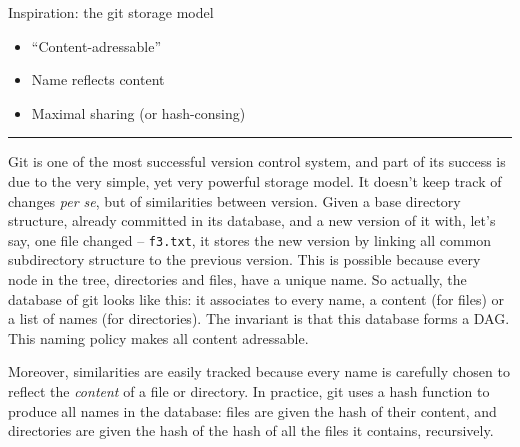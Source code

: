 \documentclass[ignorenonframetext,red]{beamer}
\begin{document}
\begin{frame}{Inspiration: the \textsf{git} storage model}
\begin{center}
\begin{overlayarea}{\textwidth}{12em}
    \end{overlayarea}
  \end{center}%
  \begin{itemize}\small %
  \item<7-> ``Content-adressable''%
  \item<8-> Name reflects content%
  \item<9-> Maximal sharing (or hash-consing)%
  \end{itemize}%
\end{frame}
\hrule

\textsf{Git} is one of the most successful version control system, and
part of its success is due to the very simple, yet very powerful
storage model. It doesn't keep track of changes \emph{per se}, but of
similarities between version. Given a base directory structure,
already committed in its database, and a new version of it with, let's
say, one file changed -- \texttt{f3.txt}, it stores the new version by
linking all common subdirectory structure to the previous version.
This is possible because every node in the tree, directories and
files, have a unique name. So actually, the database of \textsf{git}
looks like this: it associates to every name, a content (for files) or
a list of names (for directories). The invariant is that this database
forms a DAG. This naming policy makes all content adressable.

Moreover, similarities are easily tracked because every name is
carefully chosen to reflect the \emph{content} of a file or directory.
In practice, \textsf{git} uses a hash function to produce all names in
the database: files are given the hash of their content, and
directories are given the hash of the hash of all the files it
contains, recursively.
\end{document}

